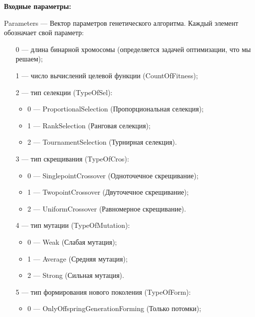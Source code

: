 \textbf{Входные параметры:}
 
Parameters --- Вектор параметров генетического алгоритма. Каждый элемент обозначает свой параметр:
 
 \begin{itemize}
 \item [0] --- длина бинарной хромосомы (определяется задачей оптимизации, что мы решаем);
 
 \item [1] --- число вычислений целевой функции (CountOfFitness);
 
 \item [2] --- тип селекции (TypeOfSel):
 
 \begin{itemize}
       \item 0 --- ProportionalSelection (Пропорциональная селекция);
 
       \item 1 --- RankSelection (Ранговая селекция);
 
       \item 2 --- TournamentSelection (Турнирная селекция).
	    \end{itemize}
 
 \item [3] --- тип скрещивания (TypeOfCros):
  \begin{itemize}
       \item 0 --- SinglepointCrossover (Одноточечное скрещивание);
 
       \item 1 --- TwopointCrossover (Двуточечное скрещивание);
 
       \item 2 --- UniformCrossover (Равномерное скрещивание).
	    \end{itemize}
 
 \item [4] --- тип мутации (TypeOfMutation):
  \begin{itemize}
       \item 0 --- Weak (Слабая мутация);
 
       \item 1 --- Average (Средняя мутация);
 
       \item 2 --- Strong (Сильная мутация).
	    \end{itemize}
 
 \item [5] --- тип формирования нового поколения (TypeOfForm):
  \begin{itemize}
       \item 0 --- OnlyOffspringGenerationForming (Только потомки);
 

\end{itemize}
\end{itemize}
